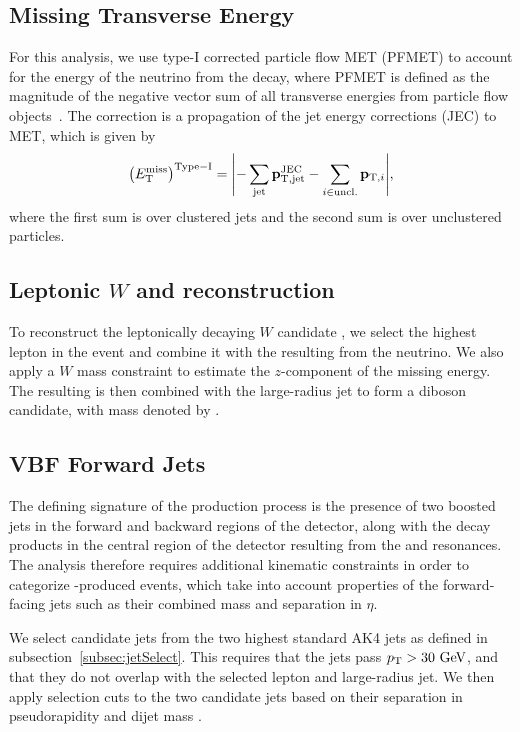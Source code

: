 \subsection{Missing Transverse Energy}

For this analysis, we use type-I corrected particle flow MET (PFMET) to account for the energy of the neutrino from the \Wlep decay, where PFMET is defined as the magnitude of the negative vector sum of all transverse energies from particle flow objects~\cite{PFMET}.
The correction is a propagation of the jet energy corrections (JEC) to MET, which is given by
\begin{equation}
  \EtmissTI=\vqty{-\sum_\mathrm{jet}\mathbf{p}_\mathrm{T,jet}^\mathrm{JEC}-\sum_{i\in\mathrm{uncl.}}\mathbf{p}_{\mathrm{T},i}},
\end{equation}
where the first sum is over clustered jets and the second sum is over unclustered particles.

\subsection{Leptonic $W$ and \WV reconstruction}

To reconstruct the leptonically decaying $W$ candidate \Wlep, we select the highest \pt lepton in the event and combine it with the \EtmissTI resulting from the neutrino.
We also apply a $W$ mass constraint to estimate the $z$-component of the missing energy.
The resulting \Wlep is then combined with the large-radius \Vhad jet to form a diboson candidate, with mass denoted by \MVV.

\subsection{VBF Forward Jets}
\label{subsec:VBFjets}

The defining signature of the \VBF production process is the presence of two boosted jets in the forward and backward regions of the detector, along with the decay products in the central region of the detector resulting from the \Wlep and \Vhad resonances.
The analysis therefore requires additional kinematic constraints in order to categorize \VBF-produced events, which take into account properties of the forward-facing \VBF jets such as their combined mass and separation in $\eta$.

We select candidate \VBF jets from the two highest \pt standard AK4 jets as defined in subsection~\ref{subsec:jetSelect}.
This requires that the \VBF jets pass $\pt>30\unit{GeV}$, and that they do not overlap with the selected lepton and large-radius jet.
We then apply selection cuts to the two candidate \VBF jets based on their separation in pseudorapidity \DetaVBF and \VBF dijet mass \mjjVBF.

